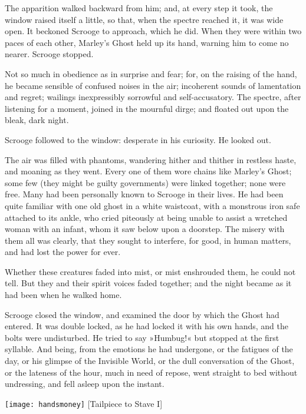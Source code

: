 The apparition walked backward from him; and, at every step it took, the window raised itself a little, so that, when the spectre reached it, it was wide open. It beckoned Scrooge to approach, which he did. When they were within two paces of each other, Marley's Ghost held up its hand, warning him to come no nearer. Scrooge stopped.

Not so much in obedience as in surprise and fear; for, on the raising of the hand, he became sensible of confused noises in the air; incoherent sounds of lamentation and regret; wailings inexpressibly sorrowful and self-accusatory. The spectre, after listening for a moment, joined in the mournful dirge; and floated out upon the bleak, dark night.

Scrooge followed to the window: desperate in his curiosity. He looked out.

The air was filled with phantoms, wandering hither and thither in restless haste, and moaning as they went. Every one of them wore chains like Marley's Ghost; some few (they might be guilty governments) were linked together; none were free. Many had been personally known to Scrooge in their lives. He had been quite familiar with one old ghost in a white waistcoat, with a monstrous iron safe attached to its ankle, who cried piteously at being unable to assist a wretched woman with an infant, whom it saw below upon a doorstep. The misery with them all was clearly, that they sought to interfere, for good, in human matters, and had lost the power for ever.

Whether these creatures faded into mist, or mist enshrouded them, he could not tell. But they and their spirit voices faded together; and the night became as it had been when he walked home.

Scrooge closed the window, and examined the door by which the Ghost had entered. It was double locked, as he had locked it with his own hands, and the bolts were undisturbed. He tried to say »Humbug!« but stopped at the first syllable. And being, from the emotions he had undergone, or the fatigues of the day, or his glimpse of the Invisible World, or the dull conversation of the Ghost, or the lateness of the hour, much in need of repose, went straight to bed without undressing, and fell asleep upon the instant.
\nopagebreak[4]
\begin{center}
\texttt{[image: handsmoney]}
[Tailpiece to Stave I]{}
\end{center}
